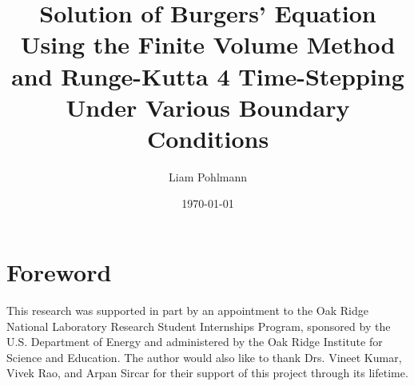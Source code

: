 \documentclass[ltr]{ornltm-app-mod} %
\author[1]{Liam Pohlmann}
\affil[1]{University of New Mexico}
\title{Solution of Burgers' Equation Using the Finite Volume Method and Runge-Kutta 4 Time-Stepping Under Various Boundary Conditions}
\date{\today}
\numberwithin{equation}{section}
\begin{document}
    \frontmatter

    \tableofcontents
    \listoffigures

%


    \section*{Foreword}
    This research was supported in part by an appointment to the Oak Ridge National Laboratory Research Student Internships Program, sponsored by the U.S. Department of Energy and administered by the Oak Ridge Institute for Science and Education.
    The author would also like to thank Drs. Vineet Kumar, Vivek Rao, and Arpan Sircar for their support of this project through its lifetime.


    \mainmatter
%
%

    \acresetall %
\end{document}
